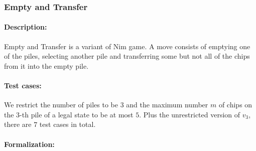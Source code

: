 \documentclass[review]{elsarticle}
\begin{document}
\subsubsection{Empty and Transfer \protect\cite{Fer1998}}
\paragraph{Description:} 
Empty and Transfer is a variant of Nim game.
A move consists of emptying one of the piles, selecting another pile and transferring some but not all of the chips from it into the empty pile. 

\paragraph{Test cases:}
We restrict the number of piles to be $3$ and the maximum number $m$ of chips on the $3$-th pile of a legal state to be at most $5$. 
Plus the unrestricted version of $v_3$, there are $7$ test cases in total.

\paragraph{Formalization:}
\end{document}
